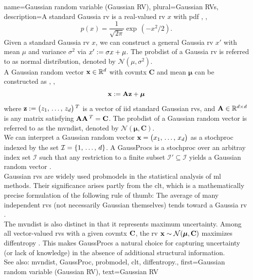 {name={Gaussian random variable (Gaussian RV)}, 
	plural={Gaussian RVs}, 
	description={A  standard Gaussia \gls{rv} is a 
		real-valued \gls{rv} $x$ with \gls{pdf} \cite{BertsekasProb}, \cite{GrayProbBook}, \cite{papoulis}
		\begin{equation}
			\nonumber
			p(x) = \frac{1}{\sqrt{2\pi}} \exp\,(-x^2/2). 
		\end{equation}
		Given a standard Gaussia \gls{rv} $x$, we can construct a general Gaussia \gls{rv} $x'$ with 
		\gls{mean} $\mu$ and \gls{variance} $\sigma^2$ via $x' := \sigma x + \mu$. The \gls{probdist} of a 
		Gaussia \gls{rv} is referred to as normal distribution, denoted by $\mathcal{N}(\mu, \sigma^2)$. 
		\\ 
		A Gaussian random \gls{vector} ${\bf x} \in \mathbb{R}^{d}$ with 
		\gls{covmtx} $\mathbf{C}$ and \gls{mean} ${\bm \mu}$ can be constructed as \cite{GrayProbBook}, \cite{papoulis}, \cite{Lapidoth09}
		\[
		{\bf x} := \mathbf{A} {\bf z} + {\bm \mu}
		\]
		where ${\bf z} := \big( z_{1}, \,\ldots, \,z_{d} \big)\,^{T}$ is a \gls{vector} 
		of \gls{iid} standard Gaussian \glspl{rv}, and ${\bf A} \in \mathbb{R}^{d \times d}$ is any \gls{matrix} satisfying ${\bf A} {\bf A}\,^{T} = {\bf C}$. 
		The \gls{probdist} of a Gaussian random \gls{vector} is referred to as the \gls{mvndist}, 
		denoted by $\mathcal{N}({\bm \mu}, \mathbf{C})$.
		\\
		We can interpret a Gaussian random \gls{vector} ${\bf x}=\big(x_{1},\,\ldots,\,x_{d}\big)$ as a \gls{stochproc} 
		indexed by the set $\mathcal{I}=\{1,\,\ldots,\,d\}$. A \glspl{GaussProc} is a 
		\gls{stochproc} over an arbitray index set $\mathcal{I}$ such that any restriction to a finite subset 
		$\mathcal{I}' \subseteq \mathcal{I}$ yields a Gaussian random \gls{vector} \cite{Rasmussen2006Gaussian}.
  		\\
        		Gaussian \glspl{rv} are widely used \glspl{probmodel} in the statistical analysis of 
        		\gls{ml} methods. Their significance arises partly from the \gls{clt}, which is a mathematically 
        		precise formulation of the following rule of thumb: The average of many independent \glspl{rv} 
		(not necessarily Gaussian themselves) tends toward a Gaussia \gls{rv} \cite{ross2013first}.
		\\ 
		The \gls{mvndist} is also distinct in that it represents \gls{maximum} \gls{uncertainty}. 
		Among all \gls{vector}-valued \glspl{rv} with a given \gls{covmtx} ${\bf C}$, the \gls{rv} ${\bf x} \sim \mathcal{N}({\bm \mu}, \mathbf{C})$ 
		maximizes \gls{diffentropy} \cite[Th. 8.6.5]{coverthomas}. This makes \glspl{GaussProc} a 
		natural choice for capturing \gls{uncertainty} (or lack of knowledge) in the absence of additional 
		structural information.
		\\ 
		See also: \gls{mvndist}, \gls{GaussProc}, \gls{probmodel}, \gls{clt}, \gls{diffentropy}.},
	first={Gaussian random variable (Gaussian RV)},
	text={Gaussian RV}
}
	
